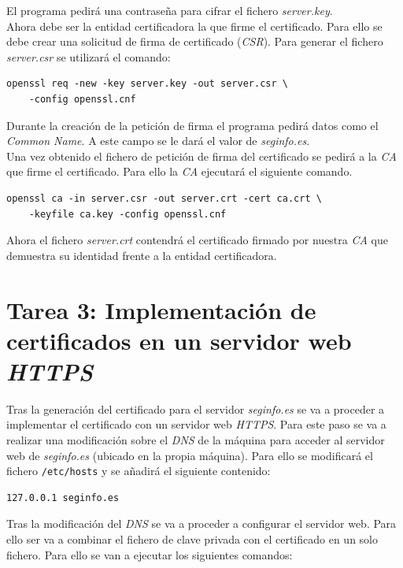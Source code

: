 \documentclass[10pt,a4paper]{article}
\begin{document}
El programa pedirá una contraseña para cifrar el fichero \emph{server.key}.\\
Ahora debe ser la entidad certificadora la que firme el certificado. Para ello se debe crear una solicitud de firma de certificado (\emph{CSR}). Para generar el fichero \emph{server.csr} se utilizará el comando:

\begin{lstlisting}
openssl req -new -key server.key -out server.csr \ 
	-config openssl.cnf
\end{lstlisting}

Durante la creación de la petición de firma el programa pedirá datos como el \emph{Common Name}. A este campo se le dará el valor de \emph{seginfo.es}.\\
Una vez obtenido el fichero de petición de firma del certificado se pedirá a la \emph{CA} que firme el certificado. Para ello la \emph{CA} ejecutará el siguiente comando.

\begin{lstlisting}
openssl ca -in server.csr -out server.crt -cert ca.crt \
	-keyfile ca.key -config openssl.cnf
\end{lstlisting}

Ahora el fichero \emph{server.crt} contendrá el certificado firmado por nuestra \emph{CA} que demuestra su identidad frente a la entidad certificadora.

\newpage
\section{Tarea 3: Implementación de certificados en un servidor web \emph{HTTPS}}

Tras la generación del certificado para el servidor \emph{seginfo.es} se va a proceder a implementar el certificado con un servidor web \emph{HTTPS}. Para este paso se va a realizar una modificación sobre el \emph{DNS} de la máquina para acceder al servidor web de \emph{seginfo.es} (ubicado en la propia máquina). Para ello se modificará el fichero \texttt{/etc/hosts} y se añadirá el siguiente contenido:

\begin{lstlisting}
127.0.0.1 seginfo.es
\end{lstlisting}

Tras la modificación del \emph{DNS} se va a proceder a configurar el servidor web. Para ello ser va a combinar el fichero de clave privada con el certificado en un solo fichero. Para ello se van a ejecutar los siguientes comandos:
\end{document}
